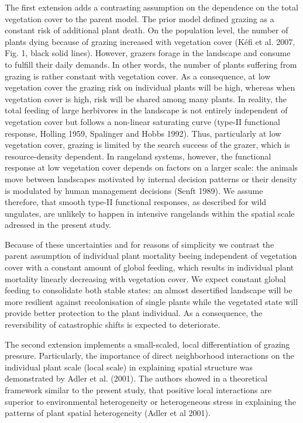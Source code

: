 The first extension adds a contrasting assumption on the dependence on the total vegetation cover to the parent model. The prior model defined grazing as a constant risk of additional plant death. On the population level, the number of plants dying because of grazing increased with vegetation cover (K\'efi et al. 2007, Fig. 1, black solid lines). However, grazers forage in the landscape and consume to fulfill their daily demands. In other words, the number of plants suffering from grazing is rather constant with vegetation cover. As a consequence, at low vegetation cover the grazing risk on individual plants will be high, whereas when vegetation cover is high, risk will be shared among many plants.
In reality, the total feeding of large herbivores in the landscape is not entirely independent of vegetation cover but follows a non-linear saturating curve (type-II functional response, Holling 1959, Spalinger and Hobbs 1992). Thus, particularly at low vegetation cover, grazing is limited by the search success of the grazer, which is resource-density dependent. In rangeland systems, however, the functional response at low vegetation cover depends on factors on a larger scale: the animals move between landscapes motivated by internal decision patterns or their density is modulated by human management decisions (Senft 1989). We assume therefore, that smooth type-II functional responses, as described for wild ungulates, are unlikely to happen in intensive rangelands within the spatial scale adressed in the present study.

Because of these uncertainties and for reasons of simplicity we contrast the parent assumption of individual plant mortality beeing independent of vegetation cover with a constant amount of global feeding, which results in individual plant mortality linearly decreasing with vegetation cover. We expect constant global feeding to consolidate both stable states: an almost desertified landscape will be more resilient against recolonisation of single plants while the vegetated state will provide better protection to the plant individual. As a consequence, the reversibility of catastrophic shifts is expected to deteriorate. 


The second extension implements a small-scaled, local differentiation of grazing pressure. %
Particularly, the importance of direct neighborhood interactions on the individual plant scale (local scale) in explaining spatial structure was demonstrated by Adler et al. (2001). The authors showed in a theoretical framework similar to the present study, that positive local interactions are superior to environmental heterogeneity or heterogeneous stress in explaining the patterns of plant spatial heterogeneity (Adler et al 2001). 

